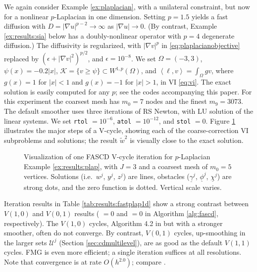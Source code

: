 \documentclass[review,hidelinks,onefignum,onetabnum,final]{siamart220329}  %
\newcommand{\eps}{\epsilon}
\newcommand{\grad}{\nabla}
\newcommand{\ip}[2]{\left<#1,#2\right>}
\begin{document}
\begin{example}  \label{ex:results:plap}
We again consider Example \ref{ex:plaplacian}, with a unilateral constraint, but now for a nonlinear $p$-Laplacian \cite{ChoeLewis1991} in one dimension.  Setting $p=1.5$ yields a fast diffusion with $D=|\grad u|^{p-2}\to \infty$ as $|\grad u|\to 0$.  (By contrast, Example \ref{ex:results:sia} below has a doubly-nonlinear operator with $p=4$ degenerate diffusion.)  The diffusivity is regularized, with $|\grad v|^p$ in \eqref{eq:plaplacianobjective} replaced by $\left(\eps + |\grad v|^2\right)^{p/2}$, and $\eps=10^{-8}$.  We set $\Omega=(-3,3)$, $\psi(x) = -0.2|x|$, $\mathcal{K} = \{v \ge \psi\} \subset W^{1,p}(\Omega)$, and $\ip\ell v = \int_\Omega g v$, where $g(x)=1$ for $|x|<1$ and $g(x)=-1$ for $|x|>1$, in VI \eqref{eq:vi}.  The exact solution is easily computed for any $p$; see the codes accompanying this paper.  For this experiment the coarsest mesh has $m_0=7$ nodes and the finest $m_9=3073$.  The default smoother uses three iterations of RS Newton, with LU solution of the linear systems.  We set \texttt{rtol} $= 10^{-6}$, \texttt{atol} $= 10^{-12}$, and \texttt{stol} $=0$.  Figure \ref{fig:imagesvcycle} illustrates the major steps of a V-cycle, showing each of the coarse-correction VI subproblems and solutions; the result $\tilde w^2$ is visually close to the exact solution.

\begin{figure}[ht]
\centering

\caption{Visualization of one FASCD V-cycle iteration for $p$-Laplacian Example \ref{ex:results:plap}, with $J=3$ and a coarsest mesh of $m_0=5$ vertices.  Solutions (i.e.~$w^j$, $y^j$, $z^j$) are lines, obstacles ($\underline{\gamma}^j$, $\underline{\phi}^j$, $\underline{\chi}^j$) are strong dots, and the zero function is dotted.  Vertical scale varies.}
\label{fig:imagesvcycle}
\end{figure}

Iteration results in Table \ref{tab:results:fastplap1d} show a strong contrast between $V(1,0)$ and $V(0,1)$ results ( $=0$ and  $=0$ in Algorithm \ref{alg:fascd}, respectively).  The $V(1,0)$ cycles, Algorithm 4.2 in \cite{GraeserKornhuber2009} but with a stronger smoother, often do not converge.  By contrast, $V(0,1)$ cycles, up-smoothing in the larger sets $\mathcal{U}^j$ (Section \ref{sec:cdmultilevel}), are as good as the default $V(1,1)$ cycles.  FMG is even more efficient; a single iteration suffices at all resolutions.   Note that convergence is at rate $O(h^{2.0})$; compare \cite{ChoeLewis1991}.
\end{example}
\end{document}
